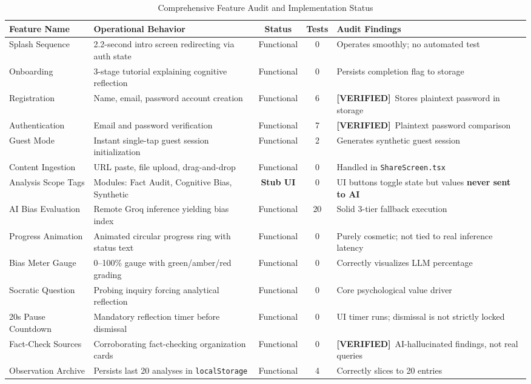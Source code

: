 \documentclass[10pt,a4paper]{report}
\newcommand{\verified}{\colorbox{green!15}{\textcolor{passGreen}{\bfseries\scriptsize [VERIFIED]}}}
\begin{document}
\begin{table}[htbp]
\centering
\scriptsize
\caption{Comprehensive Feature Audit and Implementation Status}
\begin{tabularx}{\textwidth}{l X c c p{3.2cm}}
\toprule
\textbf{Feature Name} & \textbf{Operational Behavior} & \textbf{Status} & \textbf{Tests} & \textbf{Audit Findings} \\
\midrule
Splash Sequence & 2.2-second intro screen redirecting via auth state & Functional & 0 & Operates smoothly; no automated test \\
Onboarding & 3-stage tutorial explaining cognitive reflection & Functional & 0 & Persists completion flag to storage \\
Registration & Name, email, password account creation & Functional & 6 & \verified\ Stores plaintext password in storage \\
Authentication & Email and password verification & Functional & 7 & \verified\ Plaintext password comparison \\
Guest Mode & Instant single-tap guest session initialization & Functional & 2 & Generates synthetic guest session \\
Content Ingestion & URL paste, file upload, drag-and-drop & Functional & 0 & Handled in \texttt{ShareScreen.tsx} \\
Analysis Scope Tags & Modules: Fact Audit, Cognitive Bias, Synthetic & \textbf{Stub UI} & 0 & UI buttons toggle state but values \textbf{never sent to AI} \\
AI Bias Evaluation & Remote Groq inference yielding bias index & Functional & 20 & Solid 3-tier fallback execution \\
Progress Animation & Animated circular progress ring with status text & Functional & 0 & Purely cosmetic; not tied to real inference latency \\
Bias Meter Gauge & 0--100\% gauge with green/amber/red grading & Functional & 0 & Correctly visualizes LLM percentage \\
Socratic Question & Probing inquiry forcing analytical reflection & Functional & 0 & Core psychological value driver \\
20s Pause Countdown & Mandatory reflection timer before dismissal & Functional & 0 & UI timer runs; dismissal is not strictly locked \\
Fact-Check Sources & Corroborating fact-checking organization cards & Functional & 0 & \verified\ AI-hallucinated findings, not real queries \\
Observation Archive & Persists last 20 analyses in \texttt{localStorage} & Functional & 4 & Correctly slices to 20 entries \\

\end{tabularx}
\end{table}
\end{document}
